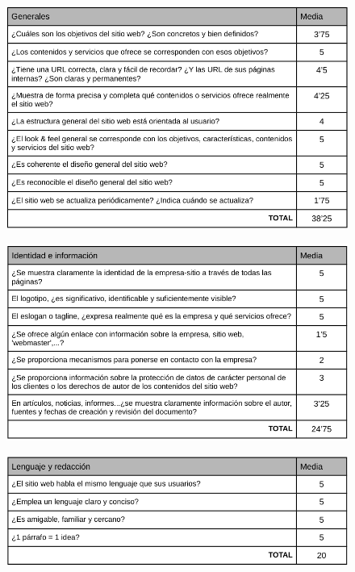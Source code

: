 \documentclass[pdftex,11pt,a4paper]{book}
\begin{document}
\begin{figure}[h]
\begin{center}
\includegraphics[width=\textwidth]{img/heuristico4}
\caption{\label{heuristico4}}
\end{center}
\end{figure}

\begin{figure}[h]
\begin{center}
\includegraphics[width=\textwidth]{img/heuristico5}
\caption{\label{heuristico5}}
\end{center}
\end{figure}

\begin{figure}[h]
\begin{center}
\includegraphics[width=\textwidth]{img/heuristico6}
\caption{\label{heuristico6}}
\end{center}
\end{figure}
\end{document}
